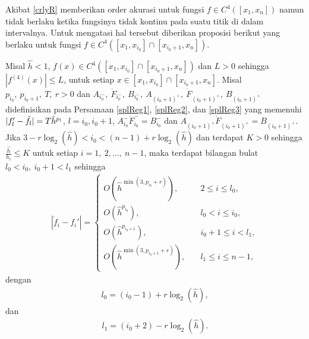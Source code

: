 Akibat \eqref{crlyR} memberikan order akurasi untuk fungsi
$f \in C^4([x_1,x_n])$ namun tidak berlaku ketika fungsinya tidak kontinu pada suatu titik di dalam intervalnya. Untuk mengatasi hal tersebut diberikan proposisi berikut yang berlaku untuk fungsi $f \in C^4([x_1,x_{i_0}] \cap [x_{i_0 +1},x_n])$.

\begin{proposisi}\label{prpsslast}
    Misal $\hat{h} < 1$, $f(x) \in C^4([x_1,x_{i_0}] \cap [x_{i_0 +1},x_n])$ dan $L > 0$ sehingga $|f^{(4)}(x)| \leq L$, untuk setiap $x\in[x_1,x_{i_0}] \cap [x_{i_0 +1},x_n]$. Misal $p_{i_0},~p_{i_0 + 1},~T,~r>0$ dan $A_{i_0^-},~\dot{F}_{i_0^-},~B_{i_0^-},~A_{(i_0+1)^+},~\dot{F}_{(i_0+1)^+},~B_{(i_0+1)^+}$ didefinisikan pada Persamaan \eqref{splReg1}, \eqref{splReg2}, dan \eqref{splReg3} yang memenuhi $|f_{l}'-\Tilde{f}_{l}|=T\hat{h}^{p_{l}}$, $l=i_0, i_0+1$, $A_{i_0}^-\dot{F}_{i_0}^- = B_{i_0}^-$ dan $A_{(i_0+1)^+}\dot{F}_{(i_0+1)^+} = B_{(i_0+1)^+}$. Jika $3 - r\log_2(\hat{h}) < i_0 < (n - 1) + r\log_2(\hat{h})$ dan terdapat $K>0$ sehingga $\frac{\hat{h}}{h_i} \leq K$ untuk setiap $i=1,~2,\dots,~n-1$, maka terdapat bilangan bulat $l_0<i_0,~i_0+1< l_1$ sehingga
    \begin{align*}
            |\dot{f}_i-f_i'|=
        \begin{cases}
        O(\hat{h}^{\min(3,p_{i_0}+r)}), \quad &2 \leq i\leq l_0, \\
        O(\hat{h}^{p_{i_0}}), & l_0 < i \leq i_0,\\
        O(\hat{h}^{p_{i_0+1}}), &i_0+1 \leq i < l_1,\\
        O(\hat{h}^{\min(3,p_{i_0+1}+r)}), \quad &l_1 \leq i\leq n-1,
        \end{cases}
    \end{align*}
    dengan
    \begin{align*}
        l_0 = (i_0-1) + r\log_2(\hat{h}),
    \end{align*}
    dan
    \begin{align*}
        l_1 = (i_0+2) - r\log_2(\hat{h}).
    \end{align*}
\end{proposisi}

